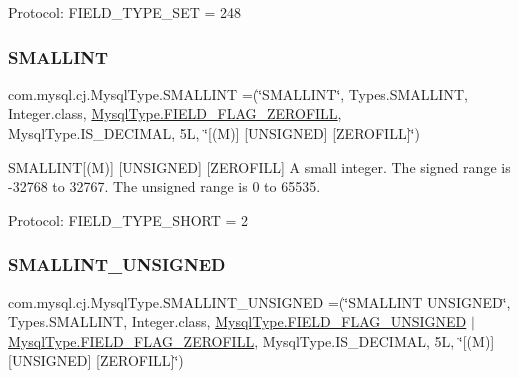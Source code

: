 Protocol\+: F\+I\+E\+L\+D\+\_\+\+T\+Y\+P\+E\+\_\+\+S\+ET = 248 \mbox{\label{enumcom_1_1mysql_1_1cj_1_1_mysql_type_a6f47bd8cc33374c77f4af4d1b9758081}} 
\subsubsection{\texorpdfstring{S\+M\+A\+L\+L\+I\+NT}{SMALLINT}}
{\footnotesize\ttfamily com.\+mysql.\+cj.\+Mysql\+Type.\+S\+M\+A\+L\+L\+I\+NT =(\char`\"{}S\+M\+A\+L\+L\+I\+NT\char`\"{}, Types.\+S\+M\+A\+L\+L\+I\+NT, Integer.\+class, \mbox{\hyperlink{enumcom_1_1mysql_1_1cj_1_1_mysql_type_abb76a1f2f3dac9a30d1b559b8ba66a48}{Mysql\+Type.\+F\+I\+E\+L\+D\+\_\+\+F\+L\+A\+G\+\_\+\+Z\+E\+R\+O\+F\+I\+LL}}, Mysql\+Type.\+I\+S\+\_\+\+D\+E\+C\+I\+M\+AL, 5\+L, \char`\"{}\mbox{[}(\+M)\mbox{]} \mbox{[}\+U\+N\+S\+I\+G\+N\+E\+D\mbox{]} \mbox{[}\+Z\+E\+R\+O\+F\+I\+L\+L\mbox{]}\char`\"{})}

S\+M\+A\+L\+L\+I\+NT\mbox{[}(M)\mbox{]} \mbox{[}U\+N\+S\+I\+G\+N\+ED\mbox{]} \mbox{[}Z\+E\+R\+O\+F\+I\+LL\mbox{]} A small integer. The signed range is -\/32768 to 32767. The unsigned range is 0 to 65535.

Protocol\+: F\+I\+E\+L\+D\+\_\+\+T\+Y\+P\+E\+\_\+\+S\+H\+O\+RT = 2 \mbox{\label{enumcom_1_1mysql_1_1cj_1_1_mysql_type_ae37a6ba8bf5532916dded17e40a94216}} 
\subsubsection{\texorpdfstring{S\+M\+A\+L\+L\+I\+N\+T\+\_\+\+U\+N\+S\+I\+G\+N\+ED}{SMALLINT\_UNSIGNED}}
{\footnotesize\ttfamily com.\+mysql.\+cj.\+Mysql\+Type.\+S\+M\+A\+L\+L\+I\+N\+T\+\_\+\+U\+N\+S\+I\+G\+N\+ED =(\char`\"{}S\+M\+A\+L\+L\+I\+NT U\+N\+S\+I\+G\+N\+ED\char`\"{}, Types.\+S\+M\+A\+L\+L\+I\+NT, Integer.\+class, \mbox{\hyperlink{enumcom_1_1mysql_1_1cj_1_1_mysql_type_a2c6701614559b1ad9955cdc4ca6337e2}{Mysql\+Type.\+F\+I\+E\+L\+D\+\_\+\+F\+L\+A\+G\+\_\+\+U\+N\+S\+I\+G\+N\+ED}} $\vert$ \mbox{\hyperlink{enumcom_1_1mysql_1_1cj_1_1_mysql_type_abb76a1f2f3dac9a30d1b559b8ba66a48}{Mysql\+Type.\+F\+I\+E\+L\+D\+\_\+\+F\+L\+A\+G\+\_\+\+Z\+E\+R\+O\+F\+I\+LL}}, Mysql\+Type.\+I\+S\+\_\+\+D\+E\+C\+I\+M\+AL, 5\+L, \char`\"{}\mbox{[}(\+M)\mbox{]} \mbox{[}\+U\+N\+S\+I\+G\+N\+E\+D\mbox{]} \mbox{[}\+Z\+E\+R\+O\+F\+I\+L\+L\mbox{]}\char`\"{})}

